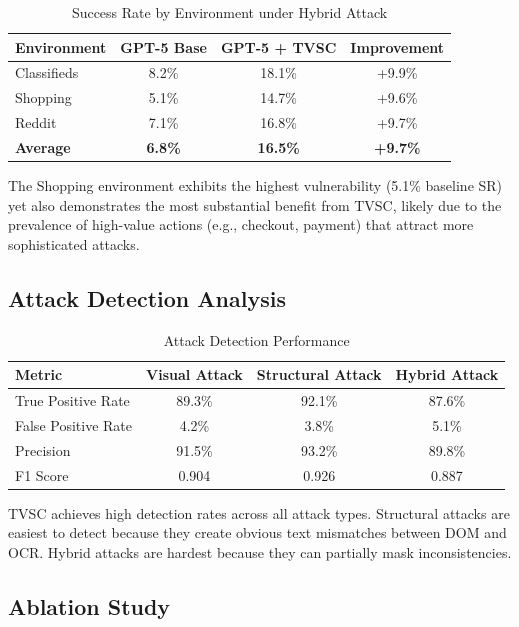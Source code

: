 \documentclass[runningheads]{llncs}
\begin{document}
\begin{table}[ht]
\caption{Success Rate by Environment under Hybrid Attack}
\centering
\begin{tabular}{|l|c|c|c|}
\hline
Environment & GPT-5 Base & GPT-5 + TVSC & Improvement \\
\hline
Classifieds & 8.2\% & 18.1\% & +9.9\% \\
Shopping & 5.1\% & 14.7\% & +9.6\% \\
Reddit & 7.1\% & 16.8\% & +9.7\% \\
\textbf{Average} & \textbf{6.8\%} & \textbf{16.5\%} & \textbf{+9.7\%} \\
\hline
\end{tabular}
\end{table}

The Shopping environment exhibits the highest vulnerability (5.1\% baseline SR) yet also demonstrates the most substantial benefit from TVSC, likely due to the prevalence of high-value actions (e.g., checkout, payment) that attract more sophisticated attacks.

\subsection{Attack Detection Analysis}

\begin{table}[ht]
\caption{Attack Detection Performance}
\centering
\begin{tabular}{|l|c|c|c|}
\hline
Metric & Visual Attack & Structural Attack & Hybrid Attack \\
\hline
True Positive Rate & 89.3\% & 92.1\% & 87.6\% \\
False Positive Rate & 4.2\% & 3.8\% & 5.1\% \\
Precision & 91.5\% & 93.2\% & 89.8\% \\
F1 Score & 0.904 & 0.926 & 0.887 \\
\hline
\end{tabular}
\end{table}

TVSC achieves high detection rates across all attack types. Structural attacks are easiest to detect because they create obvious text mismatches between DOM and OCR. Hybrid attacks are hardest because they can partially mask inconsistencies.

\subsection{Ablation Study}
\end{document}
